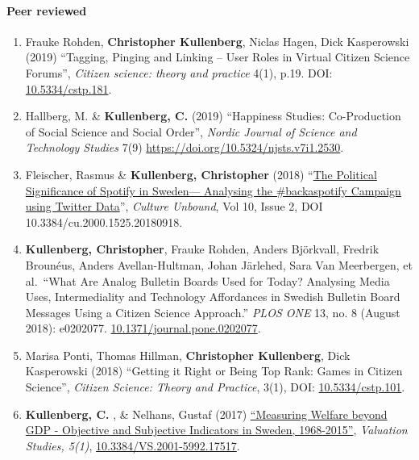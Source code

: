\documentclass[
]{article}
\providecommand{\tightlist}{%
  \setlength{\itemsep}{0pt}\setlength{\parskip}{0pt}}
\begin{document}
\hypertarget{peer-reviewed}{%
\paragraph{Peer reviewed}\label{peer-reviewed}}

\begin{enumerate}
\def\labelenumi{\arabic{enumi}.}
\tightlist
\item
  Frauke Rohden, \textbf{Christopher Kullenberg}, Niclas Hagen, Dick
  Kasperowski (2019) ``Tagging, Pinging and Linking -- User Roles in
  Virtual Citizen Science Forums'', \emph{Citizen science: theory and
  practice} 4(1), p.19. DOI:
  \href{http://doi.org/10.5334/cstp.181}{10.5334/cstp.181}.
\item
  Hallberg, M. \& \textbf{Kullenberg, C.} (2019) ``Happiness Studies:
  Co-Production of Social Science and Social Order'', \emph{Nordic
  Journal of Science and Technology Studies} 7(9)
  \url{https://doi.org/10.5324/njsts.v7i1.2530}.
\item
  Fleischer, Rasmus \& \textbf{Kullenberg, Christopher} (2018)
  ``\href{http://www.cultureunbound.ep.liu.se/article.asp?DOI=10.3384/cu.2000.1525.20180918}{The
  Political Significance of Spotify in Sweden--- Analysing the
  \#backaspotify Campaign using Twitter Data}'', \emph{Culture Unbound},
  Vol 10, Issue 2, DOI 10.3384/cu.2000.1525.20180918.
\item
  \textbf{Kullenberg, Christopher}, Frauke Rohden, Anders Björkvall,
  Fredrik Brounéus, Anders Avellan-Hultman, Johan Järlehed, Sara Van
  Meerbergen, et al.~``What Are Analog Bulletin Boards Used for Today?
  Analysing Media Uses, Intermediality and Technology Affordances in
  Swedish Bulletin Board Messages Using a Citizen Science Approach.''
  \emph{PLOS ONE} 13, no. 8 (August 2018): e0202077.
  \href{https://doi.org/10.1371/journal.pone.0202077}{10.1371/journal.pone.0202077}.
\item
  Marisa Ponti, Thomas Hillman, \textbf{Christopher Kullenberg}, Dick
  Kasperowski (2018) ``Getting it Right or Being Top Rank: Games in
  Citizen Science'', \emph{Citizen Science: Theory and Practice}, 3(1),
  DOI: \href{http://doi.org/10.5334/cstp.101}{10.5334/cstp.101}.
\item
  \textbf{Kullenberg, C.} , \& Nelhans, Gustaf (2017)
  \href{https://dx.doi.org/10.3384/VS.2001-5992.17517}{``Measuring
  Welfare beyond GDP - Objective and Subjective Indicators in Sweden,
  1968-2015''}, \emph{Valuation Studies, 5(1)},
  \href{https://dx.doi.org/10.3384/VS.2001-5992.17517}{10.3384/VS.2001-5992.17517}.

\end{enumerate}
\end{document}
